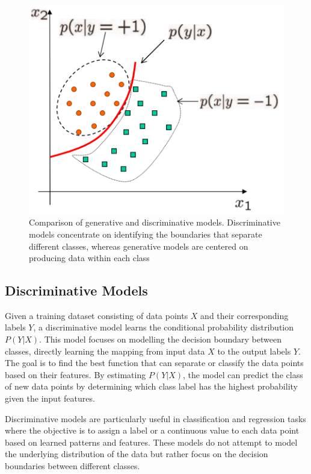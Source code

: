 \documentclass[12pt,DIV14,BCOR12mm,a4paper,footinclude=false,headinclude,parskip=half-,twoside,openright,cleardoublepage=empty,toc=index,bibliography=totoc,listof=totoc]{scrreprt}
\numberwithin{equation}{chapter}
\begin{document}
\begin{figure}
	\centering
	\includegraphics[scale=.7]{../media/Discriminative Vs Generative.PNG}
	\caption{Comparison of generative and discriminative models. Discriminative models concentrate on identifying the boundaries that separate different classes, whereas generative models are centered on producing data within each class\cite{tu2007learning}}
	\label{disc_vs_gen}
\end{figure}

\subsection{Discriminative Models}
Given a training dataset consisting of data points \(X\) and their corresponding labels \(Y\), a discriminative model learns the conditional probability distribution \(P(Y | X)\). This model focuses on modelling the decision boundary between classes, directly learning the mapping from input data \(X\)  to the output labels \(Y\). The goal is to find the best function that can separate or classify the data points based on their features. By estimating \(P(Y | X)\), the model can predict the class of new data points by determining which class label has the highest probability given the input features.

Discriminative models are particularly useful in classification and regression tasks where the objective is to assign a label or a continuous value to each data point based on learned patterns and features. These models do not attempt to model the underlying distribution of the data but rather focus on the decision boundaries between different classes.
\end{document}
